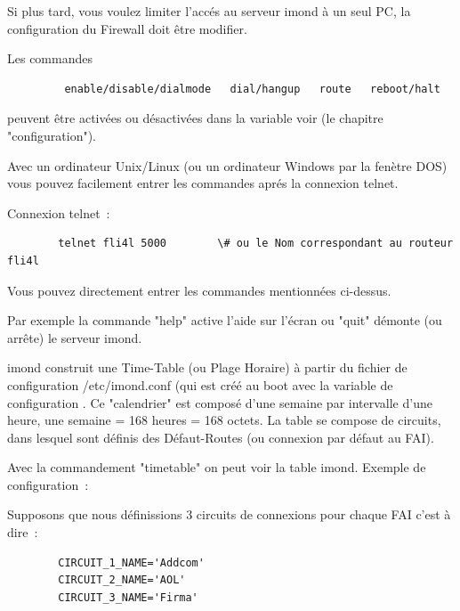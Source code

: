   Si plus tard, vous voulez limiter l'accés au serveur imond à un seul PC,
  la configuration du Firewall doit être modifier.

  Les commandes

\begin{example}
\begin{verbatim}
         enable/disable/dialmode   dial/hangup   route   reboot/halt
\end{verbatim}
\end{example}

  peuvent être activées ou désactivées dans la variable
   voir (le chapitre "configuration").

  Avec un ordinateur Unix/Linux (ou un ordinateur Windows par la
  fenètre DOS) vous pouvez facilement entrer les commandes aprés
  la connexion telnet.

  Connexion telnet~:

\begin{example}
\begin{verbatim}
        telnet fli4l 5000        \# ou le Nom correspondant au routeur fli4l
\end{verbatim}
\end{example}

  Vous pouvez directement entrer les commandes mentionnées ci-dessus.

  Par exemple la commande "help" active l'aide sur l'écran ou "quit"
  démonte (ou arrête) le serveur imond.


  imond construit une Time-Table (ou Plage Horaire) à partir du fichier
  de configuration /etc/imond.conf (qui est créé au boot avec la variable
  de configuration . Ce "calendrier" est
  composé d'une semaine par intervalle d'une heure, une semaine = 168
  heures = 168 octets. La table se compose de circuits, dans lesquel sont
  définis des Défaut-Routes (ou connexion par défaut au FAI).

  Avec la commandement "timetable" on peut voir la table imond.
  Exemple de configuration~:

Supposons que nous définissions 3 circuits de connexions pour chaque FAI c'est à dire~:

\begin{example}
\begin{verbatim}
        CIRCUIT_1_NAME='Addcom'
        CIRCUIT_2_NAME='AOL'
        CIRCUIT_3_NAME='Firma'
\end{verbatim}
\end{example}

